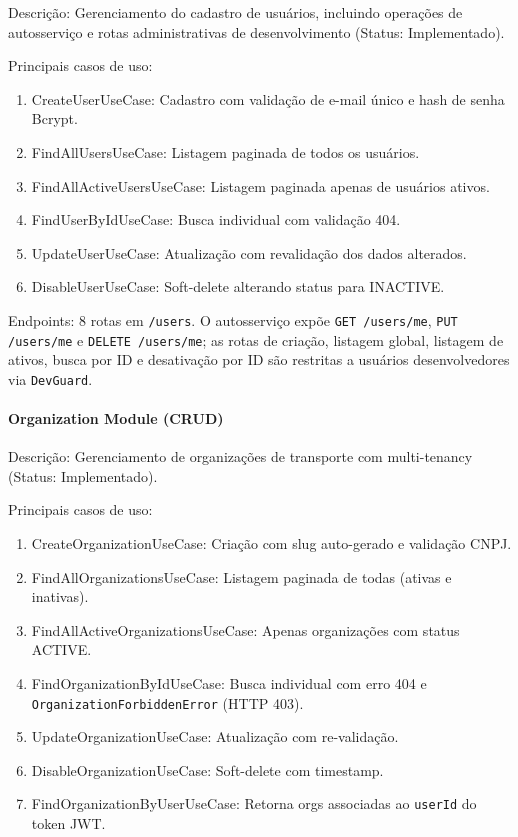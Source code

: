 Descrição: Gerenciamento do cadastro de usuários, incluindo operações de autosserviço e rotas administrativas de desenvolvimento (Status: Implementado).

Principais casos de uso:
\begin{enumerate}
\item CreateUserUseCase: Cadastro com validação de e-mail único e hash de senha Bcrypt.
\item FindAllUsersUseCase: Listagem paginada de todos os usuários.
\item FindAllActiveUsersUseCase: Listagem paginada apenas de usuários ativos.
\item FindUserByIdUseCase: Busca individual com validação 404.
\item UpdateUserUseCase: Atualização com revalidação dos dados alterados.
\item DisableUserUseCase: Soft-delete alterando status para INACTIVE.
\end{enumerate}

Endpoints: 8 rotas em \texttt{/users}. O autosserviço expõe \texttt{GET /users/me}, \texttt{PUT /users/me} e \texttt{DELETE /users/me}; as rotas de criação, listagem global, listagem de ativos, busca por ID e desativação por ID são restritas a usuários desenvolvedores via \texttt{DevGuard}.

\paragraph{Organization Module (CRUD)}

Descrição: Gerenciamento de organizações de transporte com multi-tenancy (Status: Implementado).

Principais casos de uso:
\begin{enumerate}
\item CreateOrganizationUseCase: Criação com slug auto-gerado e validação CNPJ.
\item FindAllOrganizationsUseCase: Listagem paginada de todas (ativas e inativas).
\item FindAllActiveOrganizationsUseCase: Apenas organizações com status ACTIVE.
\item FindOrganizationByIdUseCase: Busca individual com erro 404 e \texttt{OrganizationForbiddenError} (HTTP 403).
\item UpdateOrganizationUseCase: Atualização com re-validação.
\item DisableOrganizationUseCase: Soft-delete com timestamp.
\item FindOrganizationByUserUseCase: Retorna orgs associadas ao \texttt{userId} do token JWT.
\end{enumerate}

